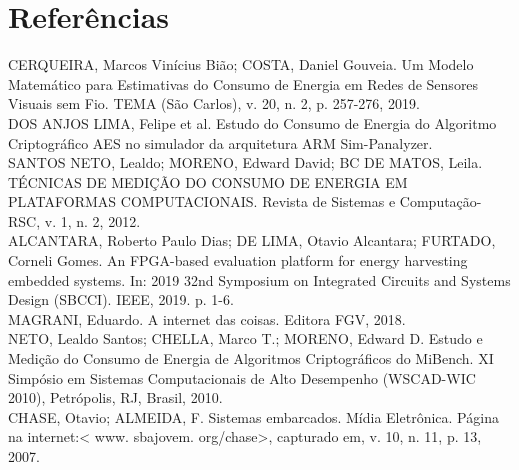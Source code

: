\chapter{Referências}
CERQUEIRA, Marcos Vinícius Bião; COSTA, Daniel Gouveia. Um Modelo Matemático para Estimativas do Consumo de Energia em Redes de Sensores Visuais sem Fio. TEMA (São Carlos), v. 20, n. 2, p. 257-276, 2019.\\

DOS ANJOS LIMA, Felipe et al. Estudo do Consumo de Energia do Algoritmo Criptográfico AES no simulador da arquitetura ARM Sim-Panalyzer.\\

SANTOS NETO, Lealdo; MORENO, Edward David; BC DE MATOS, Leila. TÉCNICAS DE MEDIÇÃO DO CONSUMO DE ENERGIA EM PLATAFORMAS COMPUTACIONAIS. Revista de Sistemas e Computação-RSC, v. 1, n. 2, 2012.\\

ALCANTARA, Roberto Paulo Dias; DE LIMA, Otavio Alcantara; FURTADO, Corneli Gomes. An FPGA-based evaluation platform for energy harvesting embedded systems. In: 2019 32nd Symposium on Integrated Circuits and Systems Design (SBCCI). IEEE, 2019. p. 1-6.\\

MAGRANI, Eduardo. A internet das coisas. Editora FGV, 2018.\\ 

NETO, Lealdo Santos; CHELLA, Marco T.; MORENO, Edward D. Estudo e Medição do Consumo de Energia de Algoritmos Criptográficos do MiBench. XI Simpósio em Sistemas Computacionais de Alto Desempenho (WSCAD-WIC 2010), Petrópolis, RJ, Brasil, 2010.\\

CHASE, Otavio; ALMEIDA, F. Sistemas embarcados. Mídia Eletrônica. Página na internet:< www. sbajovem. org/chase>, capturado em, v. 10, n. 11, p. 13, 2007.\\